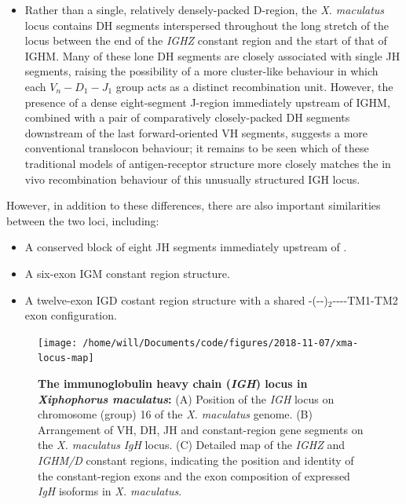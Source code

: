 \begin{itemize}
	\item Rather than a single, relatively densely-packed D-region, the \textit{X. maculatus} locus contains DH segments interspersed throughout the long stretch of the locus between the end of the \textit{IGHZ} constant region and the start of that of IGHM. Many of these lone DH segments are closely associated with single JH segments, raising the possibility of a more cluster-like behaviour in which each $V_n-D_1-J_1$ group acts as a distinct recombination unit. However, the presence of a dense eight-segment J-region immediately upstream of IGHM, combined with a pair of comparatively closely-packed DH segments downstream of the last forward-oriented VH segments, suggests a more conventional translocon behaviour; it remains to be seen which of these traditional models of antigen-receptor structure more closely matches the in vivo recombination behaviour of this unusually structured IGH locus.
	\end{itemize}
	
However, in addition to these differences, there are also important similarities between the two loci, including:

\begin{itemize}
\item A conserved block of eight JH segments immediately upstream of . %
\item A six-exon IGM constant region structure.
\item A twelve-exon IGD costant region structure with a shared -(--)$_2$----TM1-TM2 exon configuration.
\end{itemize}

	
	
		\begin{figure}
		\centering
	\texttt{[image: /home/will/Documents/code/figures/2018-11-07/xma-locus-map]} %
	\caption[The immunoglobulin heavy chain (\textit{IGH}) locus in \textit{}]{\textbf{The immunoglobulin heavy chain (\textit{IGH}) locus in \textit{Xiphophorus maculatus}:} (A) Position of the \textit{IGH} locus on chromosome (group) 16 of the \textit{X. maculatus} genome. (B) Arrangement of VH, DH, JH and constant-region gene segments on the \textit{X. maculatus} \textit{IgH} locus. (C) Detailed map of the \textit{IGHZ} and \textit{IGHM/D} constant regions, indicating the position and identity of the constant-region exons and the exon composition of expressed \textit{IgH} isoforms in \textit{X. maculatus}.}
	\label{fig:xma-locus-map}
	\end{figure}
	
